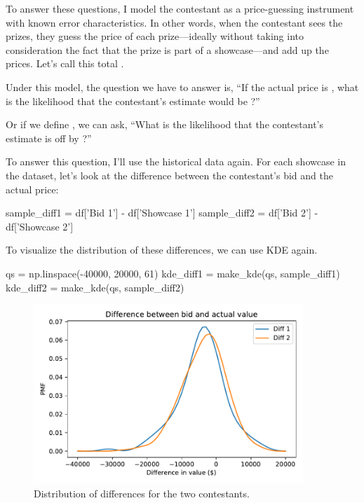 \documentclass[12pt]{book}
\theoremstyle{exercise}
\begin{document}
To answer these questions, I model the contestant
as a price-guessing instrument with known error characteristics.
In other words, when the contestant sees the prizes, they
guess the price of each prize---ideally without taking into
consideration the fact that the prize is part of a showcase---and
add up the prices.  Let's call this total .

Under this model, the question we have to answer is, ``If the
actual price is , what is the likelihood that the
contestant's estimate would be ?''

Or if we define , we can ask, ``What is the likelihood that the contestant's estimate is off by ?''

To answer this question, I'll use the historical data again. 
For each showcase in the dataset, let's look at the difference between the contestant's bid and the actual price:

\begin{code}
sample_diff1 = df['Bid 1'] - df['Showcase 1']
sample_diff2 = df['Bid 2'] - df['Showcase 2']
\end{code}

To visualize the distribution of these differences, we can use KDE again.

\begin{code}
qs = np.linspace(-40000, 20000, 61)
kde_diff1 = make_kde(qs, sample_diff1)
kde_diff2 = make_kde(qs, sample_diff2)
\end{code}

\begin{figure}
\centerline{\includegraphics[width=4in]{figs/fig08-02.pdf}}
\caption{Distribution of differences for the two contestants.}
\label{fig08-02}
\end{figure}
\end{document}
